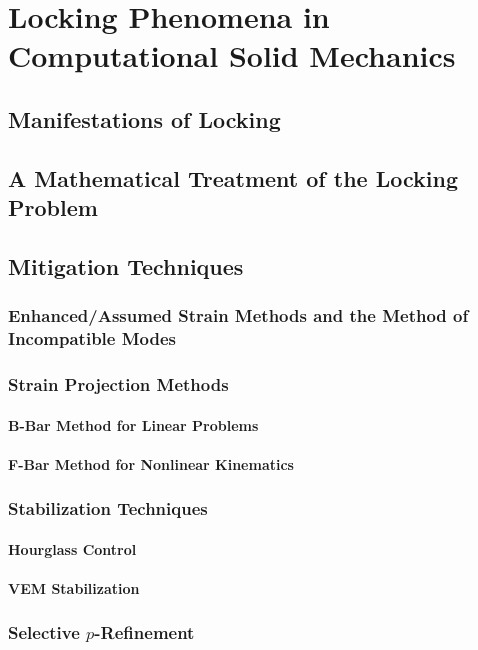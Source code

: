 \chapter{Locking Phenomena in Computational Solid Mechanics}
%
\section{Manifestations of Locking}

\section{A Mathematical Treatment of the Locking Problem}

\section{Mitigation Techniques}
\subsection{Enhanced/Assumed Strain Methods and the Method of Incompatible Modes}
\subsection{Strain Projection Methods}
\subsubsection{B-Bar Method for Linear Problems}
\subsubsection{F-Bar Method for Nonlinear Kinematics}
\subsection{Stabilization Techniques}
\subsubsection{Hourglass Control}
\subsubsection{VEM Stabilization}
\subsection{Selective $p$-Refinement}
